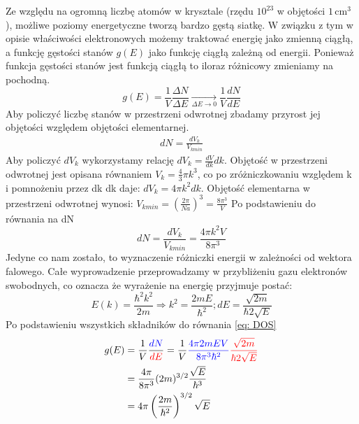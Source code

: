        \noindent Ze względu na ogromną liczbę atomów w krysztale (rzędu $10^{23}$ w objętości $1\,\text{cm}^3$), możliwe poziomy energetyczne 
        tworzą bardzo gęstą siatkę. W związku z tym w opisie właściwości elektronowych możemy traktować energię jako zmienną ciągłą, a
        funkcję gęstości stanów $g(E)$ jako funkcję ciągłą zależną od energii. Ponieważ funkcja gęstości stanów jest funkcją ciągłą to iloraz różnicowy 
        zmieniamy na pochodną.
        \begin{equation}\label{eq: DOS}
            g(E) = \frac{1}{V} \frac{\Delta N}{\Delta E} \xrightarrow[\Delta E \to 0]{} \frac{1}{V}\frac{dN}{dE}
        \end{equation}
        \noindent Aby policzyć liczbę stanów w przestrzeni odwrotnej zbadamy przyrost jej objętości względem objętości elementarnej.  
        \begin{align}
            dN = \frac{dV_k}{V_{k min}} \nonumber
        \end{align}
        Aby policzyć $dV_k$ wykorzystamy relację $dV_k = \frac{dV}{dk}dk$. Objętość w przestrzeni odwrotnej jest opisana równaniem $V_k = \frac{4}{3}\pi k^3$, co po zróżniczkowaniu względem k i pomnożeniu przez dk
        dk daje: $dV_k = 4\pi k^2 dk$. Objętość elementarna w przestrzeni odwrotnej wynosi: $V_{k min} = \left(\frac{2\pi}{Na}\right)^3 = \frac{8\pi^3}{V}$
        Po podstawieniu do równania na dN
        \begin{equation}
            dN = \frac{dV_k}{V_{k min}} = \frac{4\pi k^2 V}{8\pi^3} \nonumber
        \end{equation}
        Jedyne co nam zostało, to wyznaczenie różniczki energii w zależności od wektora falowego. Całe wyprowadzenie przeprowadzamy w przybliżeniu gazu elektronów swobodnych, 
        co oznacza że wyrażenie na energię przyjmuje postać:
        \begin{equation}
            E(k) = \frac{\hbar^2k^2}{2m} \Rightarrow k^2 = \frac{2mE}{\hbar^2}; dE = \frac{\sqrt{2m}}{\hbar 2\sqrt{E}}\nonumber
        \end{equation}
        Po podstawieniu wszystkich składników do równania \ref{eq: DOS}
        \begin{align*}
            g(E) &= \frac{1}{V}\frac{\textcolor{blue}{dN}}{\textcolor{red}{dE}} = \frac{1}{V}\textcolor{blue}{\frac{4\pi 2mEV}{8\pi^3 \hbar^2}}\textcolor{red}{\frac{\sqrt{2m}}{\hbar 2 \sqrt{E}}}\\
            &= \frac{4\pi}{8\pi^3}(2m)^{3/2}\frac{\sqrt{E}}{\hbar^3}\\
            &= 4\pi\left(\frac{2m}{\hbar^2}\right)^{3/2}\sqrt{E}
        \end{align*}
